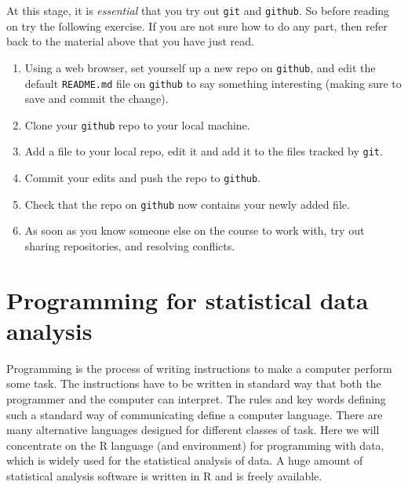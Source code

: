 \documentclass[10pt] {article}
\theoremstyle{definition}
\begin{document}
At this stage, it is {\em essential} that you try out {\tt git} and {\tt github}. So before reading on try the following exercise. If you are not sure how to do any part, then refer back to the material above that you have just read.
\begin{enumerate}
\item Using a web browser, set yourself up a new repo on {\tt github}, and edit the default {\tt README.md} file on {\tt github} to say something interesting (making sure to save and commit the change).
\item Clone your {\tt github} repo to your local machine.
\item Add a file to your local repo, edit it and add it to the files tracked by {\tt git}.
\item Commit your edits and push the repo to {\tt github}.
\item Check that the repo on {\tt github} now contains your newly added file. 
\item As soon as you know someone else on the course to work with, try out sharing repositories, and resolving conflicts.
\end{enumerate}


\section{Programming for statistical data analysis}

Programming is the process of writing instructions to make a computer perform some task. The instructions have to be written in standard way that both the programmer and the computer can interpret. The rules and key words defining such a standard way of communicating define a computer language. There are many alternative languages designed for different classes of task. Here we will concentrate on the R language (and environment) for programming with data, which is widely used for the statistical analysis of data. A huge amount of statistical analysis software is written in R and is freely available. 
\end{document}
